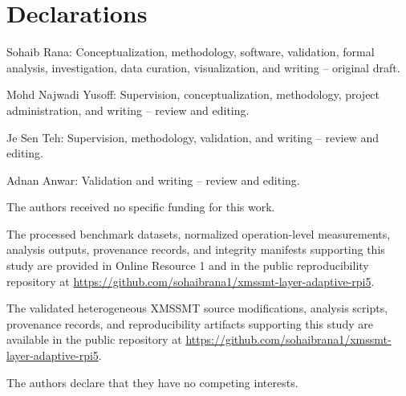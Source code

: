 \documentclass[pdflatex,sn-mathphys-num]{sn-jnl}
\begin{document}
\section*{Declarations}

Sohaib Rana: Conceptualization, methodology, software, validation, formal analysis, investigation, data curation, visualization, and writing -- original draft.

Mohd Najwadi Yusoff: Supervision, conceptualization, methodology, project administration, and writing -- review and editing.

Je Sen Teh: Supervision, methodology, validation, and writing -- review and editing.

Adnan Anwar: Validation and writing -- review and editing.

The authors received no specific funding for this work.

The processed benchmark datasets, normalized operation-level measurements, analysis outputs, provenance records, and integrity manifests supporting this study are provided in Online Resource 1 and in the public reproducibility repository at \url{https://github.com/sohaibrana1/xmssmt-layer-adaptive-rpi5}.

The validated heterogeneous XMSSMT source modifications, analysis scripts, provenance records, and reproducibility artifacts supporting this study are available in the public repository at \url{https://github.com/sohaibrana1/xmssmt-layer-adaptive-rpi5}.

The authors declare that they have no competing interests.


\end{document}
